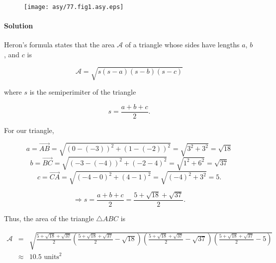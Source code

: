 
\begin{figure}\caption{}\label{77.fig1}\begin{center}\texttt{[image: asy/77.fig1.asy.eps]}\end{center}\end{figure}

\paragraph{Solution} Heron's formula states that the area $\mathcal{A}$ of a triangle whose sides have lengths $a$, $b$, and $c$ is

\[\mathcal{A}=\sqrt{s\left(s-a\right)\left(s-b\right)\left(s-c\right)}\]

where $s$ is the semiperimiter of the triangle

\[s=\frac{a+b+c}{2}.\]

For our triangle,

\[a=\overrightarrow{AB}=\sqrt{\left(0-\left(-3\right)\right)^2+\left(1-\left(-2\right)\right)^2}=\sqrt{3^2+3^2}=\sqrt{18}\]
\[b=\overrightarrow{BC}=\sqrt{\left(-3-\left(-4\right)\right)^2+\left(-2-4\right)^2}=\sqrt{1^2+6^2}=\sqrt{37}\]
\[c=\overrightarrow{CA}=\sqrt{\left(-4-0\right)^2+\left(4-1\right)^2}=\sqrt{\left(-4\right)^2+3^2}=5.\]


\[\Rightarrow s=\frac{a+b+c}{2}=\frac{5+\sqrt{18}+\sqrt{37}}{2}.\]

Thus, the area of the triangle $\triangle ABC$ is

\begin{eqnarray*}
    \mathcal{A}&=&\sqrt{\frac{5+\sqrt{18}+\sqrt{37}}{2}\left(\frac{5+\sqrt{18}+\sqrt{37}}{2}-\sqrt{18}\right)\left(\frac{5+\sqrt{18}+\sqrt{37}}{2}-\sqrt{37}\right)\left(\frac{5+\sqrt{18}+\sqrt{37}}{2}-5\right)}\\
    &\approx&10.5\mbox{ units}^2
\end{eqnarray*}
